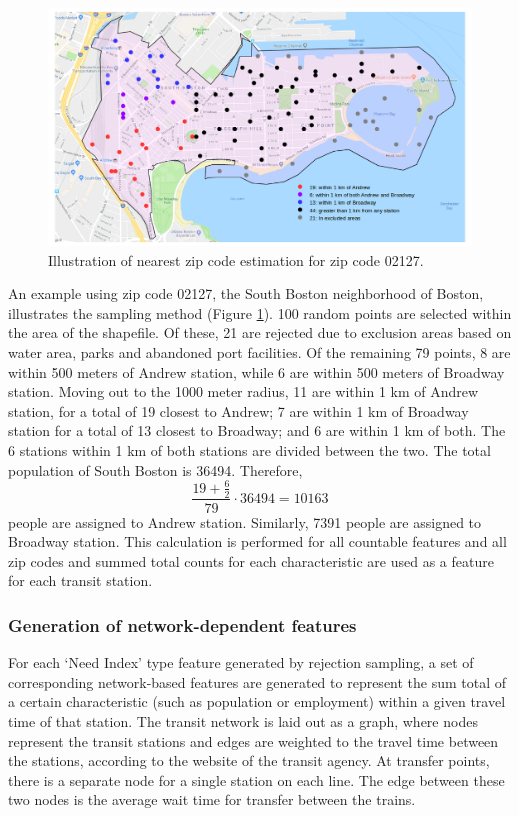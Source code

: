 \documentclass{article}
\begin{document}
\begin{figure}[H]
\begin{center}\includegraphics[scale=0.6]{geo_point_demonstration}\end{center}\caption{Illustration of nearest zip code estimation for zip code 02127.}\label{fig:f1}
\end{figure}


An example using zip code 02127, the South Boston neighborhood of Boston, illustrates the sampling method (Figure \ref{fig:f1}). 100 random points are selected within the area of the shapefile. Of these, 21 are rejected due to exclusion areas based on water area, parks and abandoned port facilities. Of the remaining 79 points, 8 are within 500 meters of Andrew station, while 6 are within 500 meters of Broadway station. Moving out to the 1000 meter radius, 11 are within 1 km of Andrew station, for a total of 19 closest to Andrew; 7 are within 1 km of Broadway station for a total of 13 closest to Broadway; and 6 are within 1 km of both. The 6 stations within 1 km of both stations are divided between the two. The total population of South Boston is 36494. Therefore, $$\frac{19 + \frac{6}{2}}{79}\cdot{36494} = 10163$$ people are assigned to Andrew station. Similarly, 7391 people are assigned to Broadway station. This calculation is performed for all countable features and all zip codes and summed total counts for each characteristic are used as a feature for each transit station. 

\subsubsection{Generation of network-dependent features}

For each `Need Index' type feature generated by rejection sampling, a set of corresponding network-based features are generated to represent the sum total of a certain characteristic (such as population or employment) within a given travel time of that station. The transit network is laid out as a graph, where nodes represent the transit stations and edges are weighted to the travel time between the stations, according to the website of the transit agency. At transfer points, there is a separate node for a single station on each line. The edge between these two nodes is the average wait time for transfer between the trains. 
\end{document}
